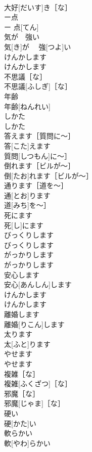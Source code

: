 \documentclass[8pt]{extreport}
\begin{document}
\begin{CJK}{UTF8}{min}
\\	大好[だいす]き［な］	
\\	ー点	
\\	ー 点[てん]	
\\	気が　強い	
\\	気[き]が　 強[つよ]い	
\\	けんかします	
\\	けんかします	
\\	不思議［な］	
\\	不思議[ふしぎ]［な］	
\\	年齢	
\\	年齢[ねんれい]	
\\	しかた	
\\	しかた	
\\	答えます［質問に〜］	
\\	答[こた]えます
\\	質問[しつもん]に〜］	
\\	倒れます［ビルが〜］	
\\	倒[たお]れます［ビルが〜］	
\\	通ります［道を〜］	
\\	通[とお]ります
\\	道[みち]を〜］	
\\	死にます	
\\	死[し]にます	
\\	びっくりします	
\\	びっくりします	
\\	がっかりします	
\\	がっかりします	
\\	安心します	
\\	安心[あんしん]します	
\\	けんかします	
\\	けんかします	
\\	離婚します	
\\	離婚[りこん]します	
\\	太ります	
\\	太[ふと]ります	
\\	やせます	
\\	やせます	
\\	複雑［な］	
\\	複雑[ふくざつ]［な］	
\\	邪魔［な］	
\\	邪魔[じゃま]［な］	
\\	硬い	
\\	硬[かた]い	
\\	軟らかい	
\\	軟[やわ]らかい	

\end{CJK}
\end{document}
